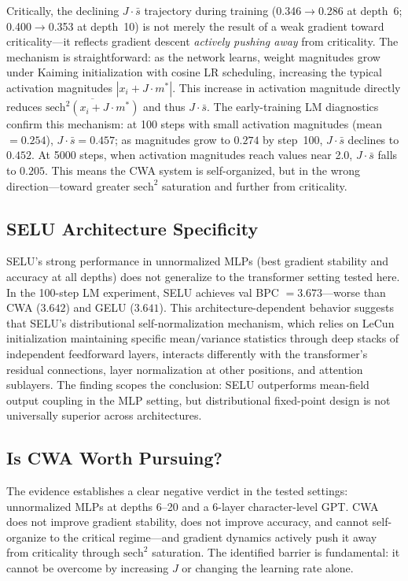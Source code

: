 \documentclass[11pt,twocolumn,letterpaper]{article}
\begin{document}
Critically, the declining $J\cdot\bar{s}$ trajectory during training (0.346$\to$0.286 at depth~6;
0.400$\to$0.353 at depth~10) is not merely the result of a weak gradient toward criticality---it reflects gradient descent
\emph{actively pushing away} from criticality. The mechanism is straightforward: as the network learns, weight magnitudes
grow under Kaiming initialization with cosine LR scheduling, increasing the typical activation magnitudes
$|x_i + J\cdot m^*|$. This increase in activation magnitude directly reduces $\overline{\text{sech}^2(x_i + J\cdot m^*)}$
and thus $J\cdot\bar{s}$. The early-training LM diagnostics confirm this mechanism: at 100 steps with small activation
magnitudes (mean $= 0.254$), $J\cdot\bar{s} = 0.457$; as magnitudes grow to $0.274$ by step~100, $J\cdot\bar{s}$ declines
to $0.452$. At 5000 steps, when activation magnitudes reach values near 2.0, $J\cdot\bar{s}$ falls to $0.205$. This
means the CWA system is self-organized, but in the wrong direction---toward greater $\text{sech}^2$ saturation and further
from criticality.

\subsection{SELU Architecture Specificity}

SELU's strong performance in unnormalized MLPs (best gradient stability and accuracy at all depths) does not generalize to
the transformer setting tested here. In the 100-step LM experiment, SELU achieves val BPC $= 3.673$---worse than CWA
($3.642$) and GELU ($3.641$). This architecture-dependent behavior suggests that SELU's distributional
self-normalization mechanism, which relies on LeCun initialization maintaining specific mean/variance statistics through
deep stacks of independent feedforward layers, interacts differently with the transformer's residual connections, layer
normalization at other positions, and attention sublayers. The finding scopes the conclusion: SELU outperforms mean-field
output coupling in the MLP setting, but distributional fixed-point design is not universally superior across architectures.

\subsection{Is CWA Worth Pursuing?}

The evidence establishes a clear negative verdict in the tested settings: unnormalized MLPs at depths 6--20 and a 6-layer
character-level GPT. CWA does not improve gradient stability, does not improve accuracy, and cannot self-organize to the
critical regime---and gradient dynamics actively push it away from criticality through $\text{sech}^2$ saturation. The
identified barrier is fundamental: it cannot be overcome by increasing $J$ or changing the learning rate alone.
\end{document}

